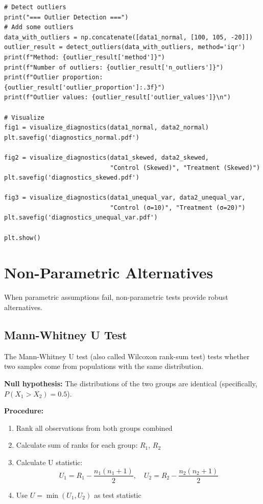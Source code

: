\begin{lstlisting}
# Detect outliers
print("=== Outlier Detection ===")
# Add some outliers
data_with_outliers = np.concatenate([data1_normal, [100, 105, -20]])
outlier_result = detect_outliers(data_with_outliers, method='iqr')
print(f"Method: {outlier_result['method']}")
print(f"Number of outliers: {outlier_result['n_outliers']}")
print(f"Outlier proportion: {outlier_result['outlier_proportion']:.3f}")
print(f"Outlier values: {outlier_result['outlier_values']}\n")

# Visualize
fig1 = visualize_diagnostics(data1_normal, data2_normal)
plt.savefig('diagnostics_normal.pdf')

fig2 = visualize_diagnostics(data1_skewed, data2_skewed,
                             "Control (Skewed)", "Treatment (Skewed)")
plt.savefig('diagnostics_skewed.pdf')

fig3 = visualize_diagnostics(data1_unequal_var, data2_unequal_var,
                             "Control (σ=10)", "Treatment (σ=20)")
plt.savefig('diagnostics_unequal_var.pdf')

plt.show()
\end{lstlisting}

\section{Non-Parametric Alternatives}

When parametric assumptions fail, non-parametric tests provide robust alternatives.

\subsection{Mann-Whitney U Test}

The Mann-Whitney U test (also called Wilcoxon rank-sum test) tests whether two samples come from populations with the same distribution.

\textbf{Null hypothesis:} The distributions of the two groups are identical (specifically, $P(X_1 > X_2) = 0.5$).

\textbf{Procedure:}
\begin{enumerate}
    \item Rank all observations from both groups combined
    \item Calculate sum of ranks for each group: $R_1$, $R_2$
    \item Calculate U statistic:
    \begin{equation}
    U_1 = R_1 - \frac{n_1(n_1 + 1)}{2}, \quad U_2 = R_2 - \frac{n_2(n_2 + 1)}{2}
    \end{equation}
    \item Use $U = \min(U_1, U_2)$ as test statistic
\end{enumerate}

